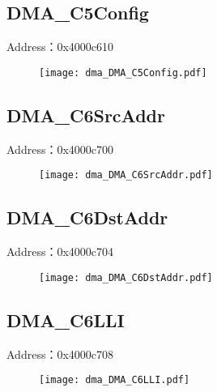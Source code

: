 \subsection{DMA\_C5Config}
\label{dma-DMA-C5Config}
Address：0x4000c610
 \begin{figure}[H]
\texttt{[image: dma\_DMA\_C5Config.pdf]}
\end{figure}

\subsection{DMA\_C6SrcAddr}
\label{dma-DMA-C6SrcAddr}
Address：0x4000c700
 \begin{figure}[H]
\texttt{[image: dma\_DMA\_C6SrcAddr.pdf]}
\end{figure}

\subsection{DMA\_C6DstAddr}
\label{dma-DMA-C6DstAddr}
Address：0x4000c704
 \begin{figure}[H]
\texttt{[image: dma\_DMA\_C6DstAddr.pdf]}
\end{figure}

\subsection{DMA\_C6LLI}
\label{dma-DMA-C6LLI}
Address：0x4000c708
 \begin{figure}[H]
\texttt{[image: dma\_DMA\_C6LLI.pdf]}
\end{figure}

